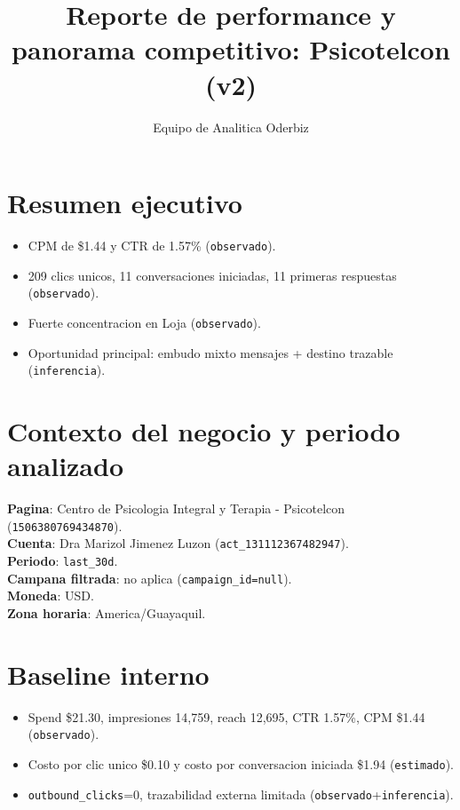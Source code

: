 \documentclass[9pt,a4paper,twocolumn,twoside]{tau-class/tau}
\title{Reporte de performance y panorama competitivo: Psicotelcon (v2)}
\author[a,1]{Equipo de Analitica Oderbiz}
\affil[a]{Unidad de Inteligencia Comercial}
\begin{document}
\maketitle
\thispagestyle{firststyle}

\section{Resumen ejecutivo}
\begin{itemize}
  \item CPM de \$1.44 y CTR de 1.57\% (\texttt{observado}).
  \item 209 clics unicos, 11 conversaciones iniciadas, 11 primeras respuestas (\texttt{observado}).
  \item Fuerte concentracion en Loja (\texttt{observado}).
  \item Oportunidad principal: embudo mixto mensajes + destino trazable (\texttt{inferencia}).
\end{itemize}

\section{Contexto del negocio y periodo analizado}
\textbf{Pagina}: Centro de Psicologia Integral y Terapia - Psicotelcon (\texttt{1506380769434870}).\\
\textbf{Cuenta}: Dra Marizol Jimenez Luzon (\texttt{act\_131112367482947}).\\
\textbf{Periodo}: \texttt{last\_30d}.\\
\textbf{Campana filtrada}: no aplica (\texttt{campaign\_id=null}).\\
\textbf{Moneda}: USD.\\
\textbf{Zona horaria}: America/Guayaquil.

\section{Baseline interno}
\begin{itemize}
  \item Spend \$21.30, impresiones 14,759, reach 12,695, CTR 1.57\%, CPM \$1.44 (\texttt{observado}).
  \item Costo por clic unico \$0.10 y costo por conversacion iniciada \$1.94 (\texttt{estimado}).
  \item \texttt{outbound\_clicks}=0, trazabilidad externa limitada (\texttt{observado}+\texttt{inferencia}).
\end{itemize}
\end{document}
